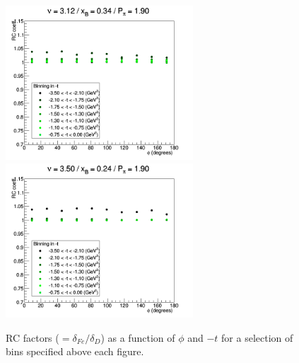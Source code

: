 \begin{figure}[tbp]
\includegraphics[width=7cm] {chap5-fig/ElecRadWei_Iron_11556.png}
\includegraphics[width=7cm] {chap5-fig/ElecRadWei_Iron_18956.png}
\caption {RC factors ($= \delta_{Fe} / \delta_D$) as a function of $\phi$ and 
$-t$ for a selection of bins specified above each figure.}
\label{fig:IsoSpin}
\end{figure}

